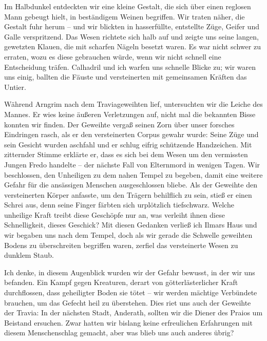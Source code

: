 Im Halbdunkel entdeckten wir eine kleine Gestalt, die sich über einen reglosen Mann gebeugt hielt, in beständigem Weinen begriffen. Wir traten näher, die Gestalt fuhr herum -- und wir blickten in hasserfüllte, entstellte Züge, Geifer und Galle verspritzend. Das Wesen richtete sich halb auf und zeigte uns seine langen, gewetzten Klauen, die mit scharfen Nägeln besetzt waren. Es war nicht schwer zu erraten, wozu es diese gebrauchen würde, wenn wir nicht schnell eine Entscheidung träfen. Calhadril und ich warfen uns schnelle Blicke zu; wir waren uns einig, ballten die Fäuste und versteinerten mit gemeinsamen Kräften das Untier. \par

Während Arngrim nach dem Traviageweihten lief, untersuchten wir die Leiche des Mannes. Er wies keine äußeren Verletzungen auf, nicht mal die bekannten Bisse konnten wir finden. Der Geweihte vergaß seinen Zorn über unser forsches Eindringen rasch, als er den versteinerten Corpus gewahr wurde: Seine Züge und sein Gesicht wurden aschfahl und er schlug eifrig schützende Handzeichen. Mit zitternder Stimme erklärte er, dass es sich bei dem Wesen um den vermissten Jungen Fredo handelte -- der nächste Fall von Elternmord in wenigen Tagen. Wir beschlossen, den Unheiligen zu dem nahen Tempel zu begeben, damit eine weitere Gefahr für die ansässigen Menschen ausgeschlossen bliebe. Als der Geweihte den versteinerten Körper anfasste, um den Trägern behilflich zu sein, stieß er einen Schrei aus, denn seine Finger färbten sich urplötzlich tiefschwarz. Welche unheilige Kraft treibt diese Geschöpfe nur an, was verleiht ihnen diese Schnelligkeit, dieses Geschick? Mit diesen Gedanken verließ ich Ilmars Haus und wir begaben uns nach dem Tempel, doch als wir gerade die Schwelle geweihten Bodens zu überschreiten begriffen waren, zerfiel das versteinerte Wesen zu dunklem Staub. \par

Ich denke, in diesem Augenblick wurden wir der Gefahr bewusst, in der wir uns befanden. Ein Kampf gegen Kreaturen, derart von götterlästerlicher Kraft durchflossen, dass geheiligter Boden sie tötet -- wir werden mächtige Verbündete brauchen, um das Gefecht heil zu überstehen. Dies riet uns auch der Geweihte der Travia: In der nächsten Stadt, Anderath, sollten wir die Diener des Praios um Beistand ersuchen. Zwar hatten wir bislang keine erfreulichen Erfahrungen mit diesem Menschenschlag gemacht, aber was blieb uns auch anderes übrig?\par

